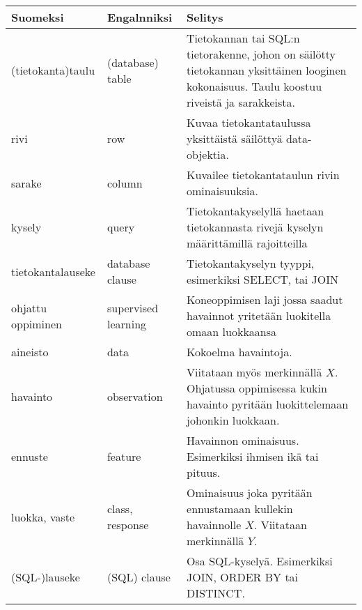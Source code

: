 \documentclass[finnish,twoside,openright]{HYgraduMLDS}
\begin{document}
\begin{center}
    \begin{tabular}{|| m{3cm} | m{3cm} | m{8cm} ||} 
        \hline
        Suomeksi                                    & Engalnniksi           &   Selitys \\ [0.5ex] 
        \hline\hline
        (tietokanta)taulu                           & (database) table      & Tietokannan tai SQL:n tietorakenne, johon on säilötty tietokannan yksittäinen looginen kokonaisuus. Taulu koostuu riveistä ja sarakkeista. \\ 
        \hline
        rivi                                        & row                   & Kuvaa tietokantataulussa yksittäistä säilöttyä data-objektia. \\
        \hline
        sarake                                      & column                & Kuvailee tietokantataulun rivin ominaisuuksia. \\
        \hline
        kysely                                      & query                 & Tietokantakyselyllä haetaan tietokannasta rivejä kyselyn määrittämillä rajoitteilla \\
        \hline
        tietokantalauseke                           & database clause       & Tietokantakyselyn tyyppi, esimerkiksi SELECT, tai JOIN \\
        \hline
        ohjattu oppiminen \label{term:supervised}     & supervised learning   & Koneoppimisen laji jossa saadut havainnot yritetään luokitella omaan luokkaansa \\
        \hline
        aineisto                                    & data                  & Kokoelma havaintoja. \\
        \hline
        havainto                                    & observation           & Viitataan myös merkinnällä $X$. Ohjatussa oppimisessa kukin havainto pyritään luokittelemaan johonkin luokkaan. \\
        \hline
        ennuste                                     & feature               & Havainnon ominaisuus. Esimerkiksi ihmisen ikä tai pituus. \\
        \hline
        luokka, vaste                               & class, response       & Ominaisuus joka pyritään ennustamaan kullekin havainnolle $X$. Viitataan merkinnällä $Y$. \\
        \hline
        (SQL-)lauseke                               & (SQL) clause          & Osa SQL-kyselyä. Esimerkiksi JOIN, ORDER BY tai DISTINCT. \\ [1ex] 
        \hline
    \end{tabular}
\end{center}
\end{document}
